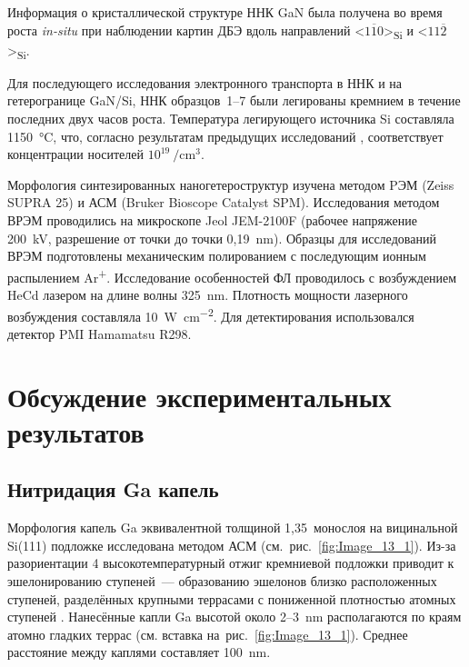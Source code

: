 Информация о кристаллической структуре ННК GaN была получена во время роста
\textit{in-situ} при наблюдении картин ДБЭ вдоль направлений
<\(1\overline{1}0\)>\textsubscript{Si} и
<\(11\overline{2}\)>\textsubscript{Si}.

Для последующего исследования электронного транспорта в ННК и на гетерогранице
GaN/Si, ННК образцов~1--7 были легированы кремнием в течение последних двух
часов роста. Температура легирующего источника Si составляла
1150~\si{\degreeCelsius}, что, согласно результатам предыдущих исследований
\cite{Bolshakov2018}, соответствует концентрации носителей
\(10^{19}~\si{\per\centi\meter\cubed}\).

Морфология синтезированных наногетероструктур изучена методом PЭМ (Zeiss SUPRA
25) и АСМ (Bruker Bioscope Catalyst SPM). Исследования методом ВРЭМ проводились
на микроскопе Jeol JEM-2100F (рабочее напряжение 200~\si{\kilo\volt},
разрешение от точки до точки 0,19~\si{\nano\meter}). Образцы для исследований
ВРЭМ подготовлены механическим полированием с последующим ионным распылением
Ar\textsuperscript{+}. Исследование особенностей ФЛ проводилось с возбуждением
HeCd лазером на длине волны 325~\si{\nano\meter}. Плотность мощности лазерного
возбуждения составляла 10~\si{\watt\per\centi\meter\squared}. Для
детектирования использовался детектор PMI Hamamatsu R298.

\section{Обсуждение экспериментальных результатов}\label{sec:ch3/sec2}

\subsection{Нитридация Ga капель}\label{subsec:ch3/sec2/sub1}

Морфология капель Ga эквивалентной толщиной 1,35~монослоя на вицинальной
Si(111) подложке исследована методом АСМ (см.~рис.~\cref{fig:Image_13_1}).
Из-за разориентации 4{\textdegree} высокотемпературный отжиг кремниевой
подложки приводит к эшелонированию ступеней~--- образованию эшелонов близко
расположенных ступеней, разделённых крупными террасами с пониженной плотностью
атомных ступеней \cite{Latyshev1998, Hibino1994}. Нанесённые капли Ga высотой
около 2--3~\si{\nano\meter} располагаются по краям атомно гладких террас (см.
вставка на~рис.~\cref{fig:Image_13_1}). Среднее расстояние между каплями
составляет 100~\si{\nano\meter}.

